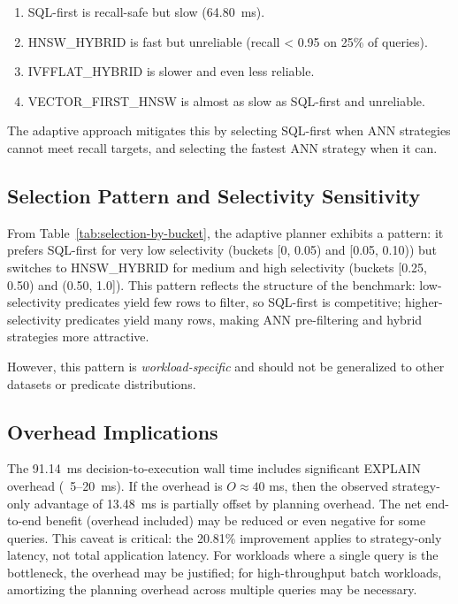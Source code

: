 \documentclass[10pt,twocolumn]{article}
\begin{document}
\begin{enumerate}
\item SQL-first is recall-safe but slow (64.80~ms).
\item HNSW\_HYBRID is fast but unreliable (recall < 0.95 on 25\% of queries).
\item IVFFLAT\_HYBRID is slower and even less reliable.
\item VECTOR\_FIRST\_HNSW is almost as slow as SQL-first and unreliable.
\end{enumerate}

The adaptive approach mitigates this by selecting SQL-first when ANN strategies cannot meet recall targets, and selecting the fastest ANN strategy when it can.

\subsection{Selection Pattern and Selectivity Sensitivity}

From Table~\ref{tab:selection-by-bucket}, the adaptive planner exhibits a pattern: it prefers SQL-first for very low selectivity (buckets [0, 0.05) and [0.05, 0.10)) but switches to HNSW\_HYBRID for medium and high selectivity (buckets [0.25, 0.50) and (0.50, 1.0]). This pattern reflects the structure of the benchmark: low-selectivity predicates yield few rows to filter, so SQL-first is competitive; higher-selectivity predicates yield many rows, making ANN pre-filtering and hybrid strategies more attractive.

However, this pattern is \emph{workload-specific} and should not be generalized to other datasets or predicate distributions.

\subsection{Overhead Implications}

The 91.14~ms decision-to-execution wall time includes significant EXPLAIN overhead (~5--20~ms). If the overhead is $O \approx 40$ ms, then the observed strategy-only advantage of 13.48~ms is partially offset by planning overhead. The net end-to-end benefit (overhead included) may be reduced or even negative for some queries. This caveat is critical: the 20.81\% improvement applies to strategy-only latency, not total application latency. For workloads where a single query is the bottleneck, the overhead may be justified; for high-throughput batch workloads, amortizing the planning overhead across multiple queries may be necessary.
\end{document}
